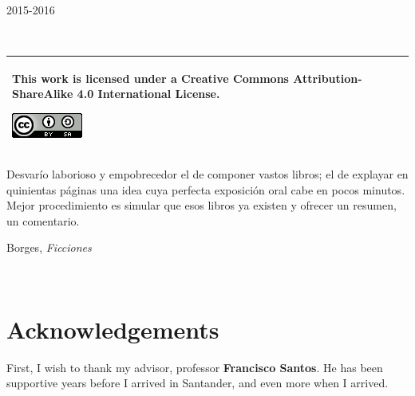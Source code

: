 \documentclass[12pt,a4paper]{article}
\theoremstyle{plain}
\theoremstyle{definition}
\begin{document}
\begin{titlepage}


{\large 2015-2016}\\[3cm] %


 

\vfill %

\end{titlepage}

~\\
\vfill
\begin{tabular}{|p{}|}
\hline
\vspace{0.08cm}
This work is licensed under a Creative Commons Attribution-ShareAlike 4.0 International License.
\begin{center}
\includegraphics[scale=1]{img/ccbysa.png}
\end{center}\\
\hline
\end{tabular}

\newpage

\epigraph{Desvarío laborioso y empobrecedor el de componer vastos libros; el de explayar en quinientas páginas una idea cuya perfecta exposición oral cabe en pocos minutos. Mejor procedimiento es simular que esos libros ya existen y ofrecer un resumen, un comentario.}{Borges, \emph{Ficciones}}
\pagestyle{plain}
\newpage\
\newpage

\thispagestyle{plain}

\section*{Acknowledgements} 

First, I wish to thank my advisor, professor \textbf{Francisco Santos}. He has been supportive years before I arrived in Santander, and even more when I arrived.
\end{document}
